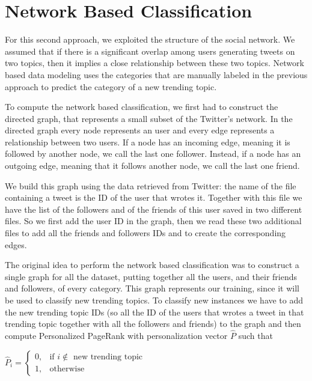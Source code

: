 \documentclass[journal,11pt]{vgtc}
\begin{document}
\section{Network Based Classification}
For this second approach, we exploited the structure of the social network. We assumed that if there is a significant overlap among users
generating tweets on two topics, then it implies a close relationship between these two topics.
Network based data modeling uses the categories that are manually labeled in the previous approach to predict
the category of a new trending topic.

To compute the network based classification, we first had to construct the directed graph, that represents a small
subset of the Twitter's network.
In the directed graph every node represents an user and every edge represents a relationship between two users.
If a node has an incoming edge, meaning it is followed by another node, we call the last one follower. Instead, if a node has an
outgoing edge, meaning that it follows another node, we call the last one friend.

We build this graph using the data retrieved from Twitter: the name of the file containing a tweet is the ID of the user that wrotes it.
Together with this file we have the list of the followers and of the friends of this user saved in two different files.
So we first add the user ID in the graph, then we read these two additional files to add all the friends and followers IDs and to
create the corresponding edges.

The original idea to perform the network based classification was to construct a single graph for all the dataset, putting
together all the users, and their friends and followers, of every category.
This graph represents our training, since it will be used to classify new trending topics.
To classify new instances we have to add the new trending topic IDs (so all the ID of the users that wrotes a tweet in that
trending topic together with all the followers and friends) to the graph and then compute Personalized PageRank with
personalization vector $\hat{P}$ such that

\bigskip

\begin{center}
$
\hat{P}_i=
\begin{cases}
  0, & \mbox{if } i \not\in \mbox{ new trending topic} \\
  1, & \mbox{otherwise }
\end{cases}
$
\end{center}
\end{document}
